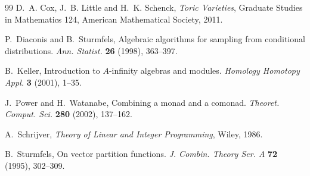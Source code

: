 \documentclass[11pt]{article}
\theoremstyle{definition}
\theoremstyle{remark}
\begin{document}
\begin{thebibliography}{99}
D.~A. Cox, J.~B. Little and H.~K. Schenck, \emph{Toric Varieties}, Graduate Studies in Mathematics 124, American
Mathematical Society, 2011.

P.~Diaconis and B.~Sturmfels, Algebraic algorithms for sampling from conditional distributions. \emph{Ann. Statist.}
\textbf{26} (1998), 363--397.

B.~Keller, Introduction to $A$-infinity algebras and modules. \emph{Homology Homotopy Appl.} \textbf{3} (2001), 1--35.

J.~Power and H.~Watanabe, Combining a monad and a comonad. \emph{Theoret. Comput. Sci.} \textbf{280} (2002), 137--162.

A.~Schrijver, \emph{Theory of Linear and Integer Programming}, Wiley, 1986.

B.~Sturmfels, On vector partition functions. \emph{J. Combin. Theory Ser. A} \textbf{72} (1995), 302--309.

\end{thebibliography}
\end{document}
